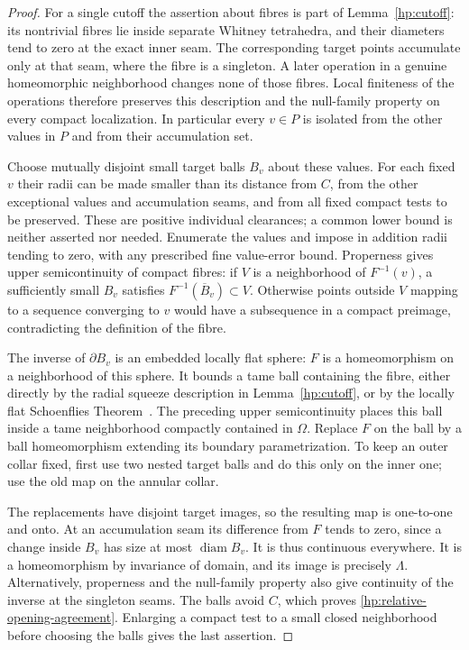 \documentclass[11pt]{article}
\numberwithin{equation}{section}
\theoremstyle{definition}
\theoremstyle{remark}
\DeclareMathOperator{\diam}{diam}
\begin{document}
\begin{proof}
For a single cutoff the assertion about fibres is part of
Lemma~\ref{hp:cutoff}: its nontrivial fibres lie inside separate
Whitney tetrahedra, and their diameters tend to zero at the exact
inner seam.  The corresponding target points accumulate only at that
seam, where the fibre is a singleton.  A later operation in a genuine
homeomorphic neighborhood changes none of those fibres.  Local
finiteness of the operations therefore preserves this description and
the null-family property on every compact localization.  In
particular every $v\in P$ is isolated from the other values in $P$
and from their accumulation set.

Choose mutually disjoint small target balls $B_v$ about these values.
For each fixed $v$ their radii can be made smaller than its distance
from $C$, from the other exceptional values and accumulation seams,
and from all fixed compact tests to be preserved.  These are positive
individual clearances; a common lower bound is neither asserted nor
needed.  Enumerate the values and impose in addition radii tending to
zero, with any prescribed fine value-error bound.  Properness gives
upper semicontinuity of compact fibres: if $V$ is a neighborhood of
$F^{-1}(v)$, a sufficiently small $B_v$ satisfies
$F^{-1}(\overline B_v)\subset V$.  Otherwise points outside $V$
mapping to a sequence converging to $v$ would have a subsequence in a
compact preimage, contradicting the definition of the fibre.

The inverse of $\partial B_v$ is an embedded locally flat sphere:
$F$ is a homeomorphism on a neighborhood of this sphere.  It bounds a
tame ball containing the fibre, either directly by the radial squeeze
description in Lemma~\ref{hp:cutoff}, or by the locally flat
Schoenflies Theorem~\cite[Theorem~5]{Brown1960}.  The preceding
upper semicontinuity places this ball inside a tame neighborhood
compactly contained in $\Omega$.  Replace $F$ on the ball by a ball
homeomorphism extending its boundary parametrization.  To keep an
outer collar fixed, first use two nested target balls and do this
only on the inner one; use the old map on the annular collar.

The replacements have disjoint target images, so the resulting map
is one-to-one and onto.  At an accumulation seam its difference from
$F$ tends to zero, since a change inside $B_v$ has size at most
$\diam B_v$.  It is thus continuous everywhere.  It is a
homeomorphism by invariance of domain, and its image is precisely
$\Lambda$.  Alternatively, properness and the null-family property
also give continuity of the inverse at the singleton seams.  The
balls avoid $C$, which proves
\eqref{hp:relative-opening-agreement}.  Enlarging a compact test to
a small closed neighborhood before choosing the balls gives the last
assertion.
\end{proof}
\end{document}

